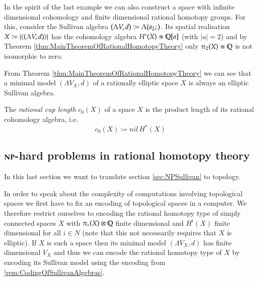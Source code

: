  \begin{Example}
  In the spirit of the last example we can also construct a space with infinite dimensional cohomology and 
  finite dimensional rational homotopy groups. For this, consider the Sullivan algebra 
  $(\Lambda V,d) \coloneqq \Lambda(a_2 ;)$. Its spatial realisation $ X \coloneqq | \langle (\Lambda V,d) \rangle |$ has the cohomology
  algebra $H^*(X) \cong \mathbb{Q}[a]$ (with $|a| = 2$) and by Theorem \ref{thm:MainTheoremOfRationalHomotopyTheory} only
  $\pi_2(X) \cong \mathbb{Q}$ is not isomorphic to zero.
 \end{Example}



\begin{Remark}
 From Theorem \ref{thm:MainTheoremOfRationalHomotopyTheory} we can see that a minimal model $(\Lambda V_X,d)$ of a
 rationally elliptic space $X$ is always an elliptic Sullivan algebra.
\end{Remark}



\begin{Definition}
 The \emph{rational cup length} $c_0 (X)$ of a space $X$ is the product length of its rational cohomology algebra,
 i.e. 
 $$ c_0 (X) \coloneqq nil \, H^*(X) $$
\end{Definition}



\subsection{$\mathbf{NP}$-hard problems in rational homotopy theory}

In this last section we want to translate section \ref{sec:NPSullivan} to topology.

\begin{Remark}
 In order to speak about the complexity of computations involving topological spaces we first have to
 fix an encoding of topological spaces in a computer. We therefore restrict ourselves to encoding the
 rational homotopy type of simply connected
 spaces $X$ with $\pi_*(X) \otimes \mathbb{Q}$ finite dimensional and $H^i(X)$ finite dimensional for all $i \in N$
 (note that this not necessarily requires that $X$ is elliptic). If $X$ is such a space then
 its minimal model $(\Lambda V_X, d)$ has finite dimensional $V_X$ and thus
 we can encode the rational homotopy type of $X$ by encoding its Sullivan model using the encoding from 
 \ref{rem:CodingOfSullivanAlgebras}. 
\end{Remark}

